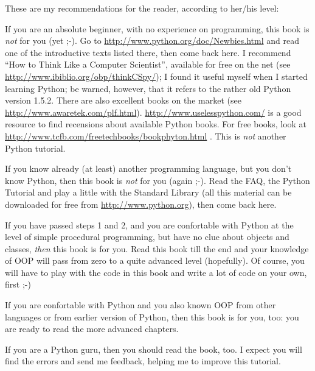 \documentclass[11pt,english]{book}
\begin{document}
These are my recommendations for the reader, according to her/his level:
\begin{list}{.}
{
\setlength{\rightmargin}{\leftmargin}
}
\item 
If you are an absolute beginner, with no experience on programming,
this book is \emph{not} for you (yet ;-). Go to 
\href{http://www.python.org/doc/Newbies.html}{http://www.python.org/doc/Newbies.html} and read one of the introductive 
texts listed there, then come back here. I recommend ``How to Think Like 
a Computer Scientist'', available for free on the net (see 
\href{http://www.ibiblio.org/obp/thinkCSpy/}{http://www.ibiblio.org/obp/thinkCSpy/}); I found it useful myself when 
I started learning Python; be warned, however, that it refers to the rather 
old Python version 1.5.2. There are also excellent books 
on the market (see \href{http://www.awaretek.com/plf.html}{http://www.awaretek.com/plf.html}). 
\href{http://www.uselesspython.com/}{http://www.uselesspython.com/} is a good resource to find recensions 
about available Python books. For free books, look at
\href{http://www.tcfb.com/freetechbooks/bookphyton.html}{http://www.tcfb.com/freetechbooks/bookphyton.html} .
This is \emph{not} another Python tutorial.

\item 
If you know already (at least) another programming language, but you don't
know Python, then this book is \emph{not} for you (again ;-). Read the FAQ, the
Python Tutorial and play a little with the Standard Library (all this
material can be downloaded for free from  \href{http://www.python.org}{http://www.python.org}), then
come back here.

\item 
If you have passed steps 1 and 2, and you are confortable with Python
at the level of simple procedural programming, but have no clue about
objects and classes, \emph{then} this book is for you. Read this book till
the end and your knowledge of OOP will pass from zero to a quite advanced 
level (hopefully). Of course, you will have to play with the code in 
this book and write a lot of code on your own, first ;-)

\item 
If you are confortable with Python and you also known OOP from other
languages or from earlier version of Python, then this book is for
you, too: you are ready to read the more advanced chapters.

\item 
If you are a Python guru, then you should read the book, too. I expect
you will find the errors and send me feedback, helping me to improve
this tutorial.

\end{list}
\end{document}
